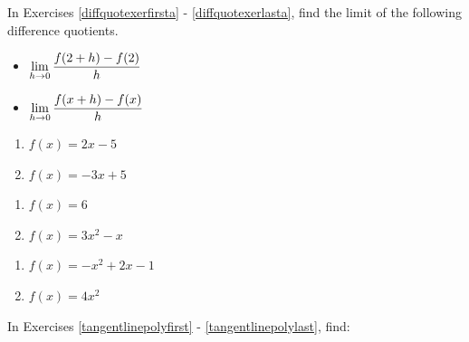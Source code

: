 \label{ExercisesforAppDerivatives}
In Exercises \ref{diffquotexerfirsta} - \ref{diffquotexerlasta}, find the limit of the following difference quotients.

\begin{multicols}{2}

\begin{itemize}

\item  $\displaystyle{\lim_{h \rightarrow 0} \dfrac{f(2+h) - f(2)}{h}}$

\item  $\displaystyle{\lim_{h \rightarrow 0} \dfrac{f(x+h) - f(x)}{h}}$

\end{itemize}

\end{multicols}


\begin{multicols}{2}

\begin{enumerate}


\item $f(x) = 2x - 5$ \label{diffquotexerfirsta}
\item $f(x) = -3x + 5$

\setcounter{HW}{\value{enumi}}
\end{enumerate}
\end{multicols}

\begin{multicols}{2}
\begin{enumerate}
\setcounter{enumi}{\value{HW}}

\item $f(x) = 6$
\item $f(x) = 3x^2 - x$

\setcounter{HW}{\value{enumi}}
\end{enumerate}
\end{multicols}

\begin{multicols}{2}
\begin{enumerate}
\setcounter{enumi}{\value{HW}}

\item $f(x) = -x^2 + 2x - 1$
\item\label{diffquotexerlasta}  $f(x) = 4x^2$ 

\setcounter{HW}{\value{enumi}}
\end{enumerate}
\end{multicols}


In Exercises \ref{tangentlinepolyfirst} - \ref{tangentlinepolylast}, find:


